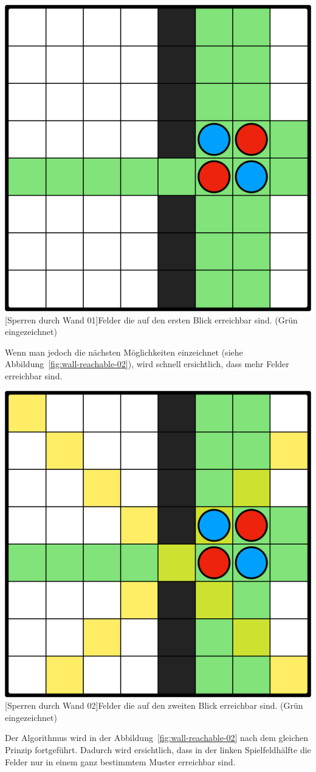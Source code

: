 \vspace{1em}
\begin{minipage}{\linewidth}
    \centering
    \includegraphics[width=0.45\linewidth]{pics/wall-reachable/wall-reachable-01}
    [Sperren durch Wand 01]{Felder die auf den ersten Blick erreichbar sind. (Gr\"un eingezeichnet)}
    \label{fig:wall-reachable-01}
\end{minipage}
\vspace{0.5em}

Wenn man jedoch die n\"achsten M\"oglichkeiten einzeichnet (siehe Abbildung~\ref{fig:wall-reachable-02}), wird schnell ersichtlich, dass mehr Felder erreichbar sind.

\vspace{1em}
\begin{minipage}{\linewidth}
    \centering
    \includegraphics[width=0.45\linewidth]{pics/wall-reachable/wall-reachable-02}
    [Sperren durch Wand 02]{Felder die auf den zweiten Blick erreichbar sind. (Gr\"un eingezeichnet)}
    \label{fig:wall-reachable-02}
\end{minipage}
\vspace{0.5em}

Der Algorithmus wird in der Abbildung~\ref{fig:wall-reachable-02} nach dem gleichen Prinzip fortgef\"uhrt.
Dadurch wird ersichtlich, dass in der linken Spielfeldh\"alfte die Felder nur in einem ganz bestimmtem Muster erreichbar sind.

